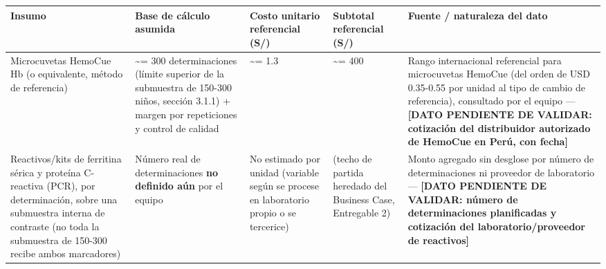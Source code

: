 \documentclass[11pt,a4paper]{article}
\begin{document}
{\small
\begin{longtable}[]{@{}
  >{\raggedright\arraybackslash}p{}
  >{\raggedright\arraybackslash}p{}
  >{\raggedright\arraybackslash}p{}
  >{\raggedright\arraybackslash}p{}
  >{\raggedright\arraybackslash}p{}@{}}
\toprule\noalign{}
\begin{minipage}[b]{\linewidth}\raggedright
Insumo
\end{minipage} & \begin{minipage}[b]{\linewidth}\raggedright
Base de cálculo asumida
\end{minipage} & \begin{minipage}[b]{\linewidth}\raggedright
Costo unitario referencial (S/)
\end{minipage} & \begin{minipage}[b]{\linewidth}\raggedright
Subtotal referencial (S/)
\end{minipage} & \begin{minipage}[b]{\linewidth}\raggedright
Fuente / naturaleza del dato
\end{minipage} \\
\midrule\noalign{}
\endhead
\bottomrule\noalign{}
\endlastfoot
Microcuvetas HemoCue Hb (o equivalente, método de referencia) & \textasciitilde= 300 determinaciones (límite superior de la submuestra de 150-300 niños, sección 3.1.1) + margen por repeticiones y control de calidad & \textasciitilde= 1.3 & \textasciitilde= 400 & Rango internacional referencial para microcuvetas HemoCue (del orden de USD 0.35-0.55 por unidad al tipo de cambio de referencia), consultado por el equipo --- \textbf{{[}DATO PENDIENTE DE VALIDAR: cotización del distribuidor autorizado de HemoCue en Perú, con fecha{]}} \\
Reactivos/kits de ferritina sérica y proteína C-reactiva (PCR), por determinación, sobre una submuestra interna de contraste (no toda la submuestra de 150-300 recibe ambos marcadores) & Número real de determinaciones \textbf{no definido aún} por el equipo & No estimado por unidad (variable según se procese en laboratorio propio o se tercerice) & 600 (techo de partida heredado del Business Case, Entregable 2) & Monto agregado sin desglose por número de determinaciones ni proveedor de laboratorio --- \textbf{{[}DATO PENDIENTE DE VALIDAR: número de determinaciones planificadas y cotización del laboratorio/proveedor de reactivos{]}} \\
\end{longtable}
}
\end{document}
